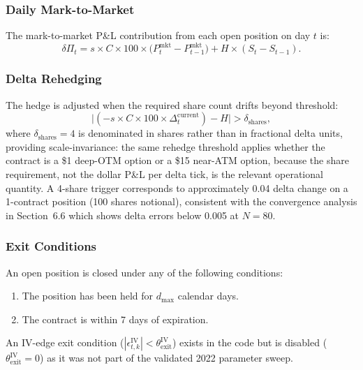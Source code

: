 \documentclass[10pt,twocolumn]{article}
\begin{document}
\subsubsection{Daily Mark-to-Market}

The mark-to-market P\&L contribution from each open position on day $t$ is:
%
\begin{equation}
\delta\Pi_t = s \times C \times 100 \times
              \bigl(P_t^{\text{mkt}} - P_{t-1}^{\text{mkt}}\bigr)
            + H \times (S_t - S_{t-1}).
\end{equation}

\subsubsection{Delta Rehedging}

The hedge is adjusted when the required share count drifts beyond threshold:
%
\begin{equation}
\bigl|(-s \times C \times 100 \times \Delta_t^{\text{current}})
     - H\bigr| > \delta_{\text{shares}},
\end{equation}
%
where $\delta_{\text{shares}} = 4$ is denominated in shares rather than in
fractional delta units, providing scale-invariance: the same rehedge threshold
applies whether the contract is a \$1 deep-OTM option or a \$15 near-ATM
option, because the share requirement, not the dollar P\&L per delta tick,
is the relevant operational quantity.  A 4-share trigger corresponds to
approximately 0.04 delta change on a 1-contract position (100 shares notional),
consistent with the convergence analysis in Section~6.6 which shows delta
errors below 0.005 at $N = 80$.

\subsubsection{Exit Conditions}

An open position is closed under any of the following conditions:
\begin{enumerate}[noitemsep]
  \item The position has been held for $d_{\text{max}}$ calendar days.
  \item The contract is within 7 days of expiration.
\end{enumerate}
An IV-edge exit condition ($|\epsilon_{t,k}^{\text{IV}}| <
\theta_{\text{exit}}^{\text{IV}}$) exists in the code but is disabled
($\theta_{\text{exit}}^{\text{IV}} = 0$) as it was not part of the validated
2022 parameter sweep.
\end{document}
